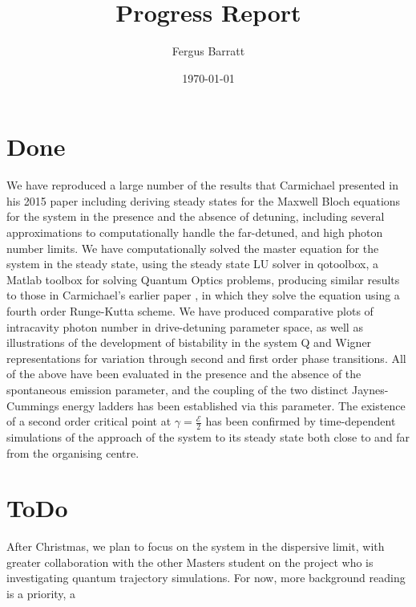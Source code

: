 \documentclass[reqno]{amsart}
\title{Progress Report}
\author{Fergus Barratt}
\date{\today}
\newcommand{\Epsilon}{\mathcal{E}}
\begin{document}
  \maketitle
  \section{Done}
  We have reproduced a large number of the results that Carmichael presented in his 2015 paper \autocite{Carmichael} including deriving steady states for the Maxwell Bloch equations for the system in the presence and the absence of detuning, including several approximations to computationally handle the far-detuned, and high photon number limits. We have computationally solved the master equation for the system in the steady state, using the steady state LU solver in qotoolbox, a Matlab toolbox for solving Quantum Optics problems, producing similar results to those in Carmichael's earlier paper \autocite{Alsing}, in which they solve the equation using a fourth order Runge-Kutta scheme. We have produced comparative plots of intracavity photon number in drive-detuning parameter space, as well as illustrations of the development of bistability in the system Q and Wigner representations for variation through second and first order phase transitions. All of the above have been evaluated in the presence and the absence of the spontaneous emission parameter, and the coupling of the two distinct Jaynes-Cummings energy ladders has been established via this parameter. The existence of a second order critical point at $\gamma = \frac{\Epsilon}{2}$ has been confirmed by time-dependent simulations of the approach of the system to its steady state both close to and far from the organising centre.
  \section{ToDo}
  After Christmas, we plan to focus on the system in the dispersive limit, with greater collaboration with the other Masters student on the project who is investigating quantum trajectory simulations. For now, more background reading is a priority, a


  \printbibliography\
\end{document}
